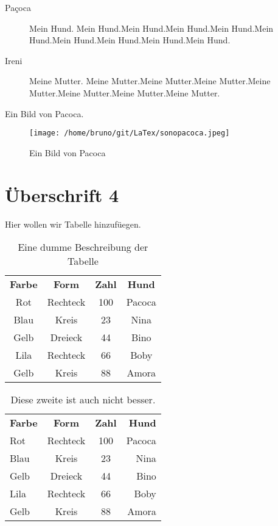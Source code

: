 \documentclass[pdftex, a4paper]{scrartcl}
\begin{document}
    \begin{description}
        \item [Paçoca] Mein Hund. Mein Hund.Mein Hund.Mein Hund.Mein Hund.Mein Hund.Mein Hund.Mein Hund.Mein Hund.Mein Hund.
        \item [Ireni] Meine Mutter. Meine Mutter.Meine Mutter.Meine Mutter.Meine Mutter.Meine Mutter.Meine Mutter.Meine Mutter.
    \end{description}


    Ein Bild von Pacoca.
    \begin{figure}[htb]
        \centering
        \texttt{[image: /home/bruno/git/LaTex/sonopacoca.jpeg]}
        \caption{Ein Bild von Pacoca}
        \label{fig:pacoca}
    \end{figure}

    \section{Überschrift 4}

    Hier wollen wir Tabelle hinzufüegen.
    \begin{table}
        \centering
        \begin{tabular}{|c|c|c|c|}
            \textbf{Farbe} & \textbf{Form} &   \textbf{Zahl} & \textbf{Hund} \\
            Rot             & Rechteck      &  100           & Pacoca  \\
            Blau            & Kreis         &  23            & Nina  \\
            Gelb            & Dreieck       &  44            & Bino  \\
            Lila            & Rechteck      &  66            & Boby  \\
            Gelb            & Kreis         &  88            & Amora  \\
        \end{tabular}
        \caption{Eine dumme Beschreibung der Tabelle}
        \label{tbl:beispieltabelle1}
    \end{table}


    \begin{table}
        \centering
        \begin{tabular}{|lccr|}
            \hline
            \textbf{Farbe} & \textbf{Form} &   \textbf{Zahl} & \textbf{Hund} \\
            Rot             & Rechteck      &  100           & Pacoca  \\
            \hline
            Blau            & Kreis         &  23            & Nina  \\
            \hline
            Gelb            & Dreieck       &  44            & Bino  \\
            \hline
            Lila            & Rechteck      &  66            & Boby  \\
            \hline
            Gelb            & Kreis         &  88            & Amora  \\
            \hline
        \end{tabular}
        \caption{Diese zweite ist auch nicht besser.}
        \label{tbl:beispieltabelle1}
    \end{table}
    
\end{document}
